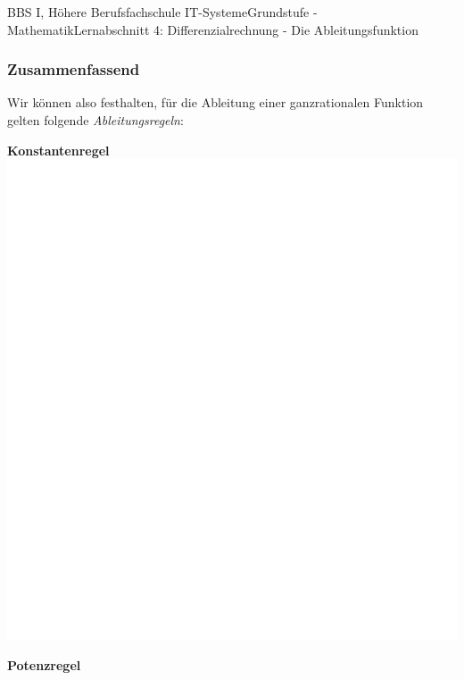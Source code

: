 \documentclass[11pt,twocolumn,oneside,openany,headings=optiontotoc,11pt,numbers=noenddot]{article}
\begin{document}
\begin{worksheet}{BBS I, Höhere Berufsfachschule IT-Systeme}{Grundstufe - Mathematik}{Lernabschnitt 4: Differenzialrechnung - Die Ableitungsfunktion}
		\subsubsection{Zusammenfassend}
		Wir können also festhalten, für die Ableitung einer ganzrationalen Funktion gelten folgende \textit{Ableitungsregeln}:\\
		\par
		\textbf{Konstantenregel}\\
		\includegraphics[scale=0.1]{../../empty.jpg}\\
		\par
		\textbf{Potenzregel}\\

\end{worksheet}
\end{document}
